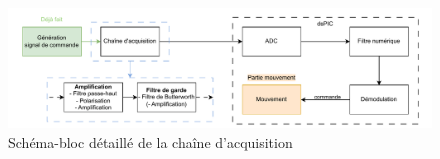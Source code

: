 \begin{figure}[H]
    \centering
    \includegraphics[scale=0.8]{pdffiles/schemabloc.pdf}
    \caption{Schéma-bloc détaillé de la chaîne d'acquisition}
    \label{fig:bloc_chaine}
\end{figure}